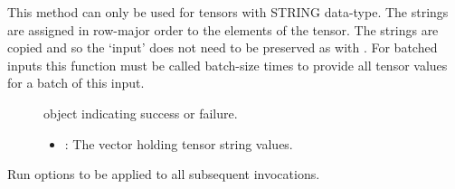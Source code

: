 \documentclass[letterpaper,10pt,english]{sphinxmanual}
\begin{document}
\begin{fulllineitems}
\begin{fulllineitems}
\begin{fulllineitems}
This method can only be used for tensors with STRING data-type. The strings are assigned in row-major order to the elements of the tensor. The strings are copied and so the ‘input’ does not need to be preserved as with {\hyperref[\detokenize{cpp_api/classnvidia_1_1inferenceserver_1_1client_1_1InferContext_1_1Input:classnvidia_1_1inferenceserver_1_1client_1_1InferContext_1_1Input_1a414fe9afbb60a48f162bac5439beee4d}]{}}. For batched inputs this function must be called batch-size times to provide all tensor values for a batch of this input. \begin{description}
\item[{}] \leavevmode
{\hyperref[\detokenize{cpp_api/classnvidia_1_1inferenceserver_1_1client_1_1Error:classnvidia_1_1inferenceserver_1_1client_1_1Error}]{}} object indicating success or failure. 

\item[{}] \leavevmode\begin{itemize}
\item {} 
: The vector holding tensor string values. 

\end{itemize}

\end{description}


\end{fulllineitems}


\end{fulllineitems}


\begin{fulllineitems}
\label{\detokenize{cpp_api/classnvidia_1_1inferenceserver_1_1client_1_1InferContext:_CPPv4N6nvidia15inferenceserver6client12InferContext7OptionsE}}%
\pysigstartmultiline
{}\label{\detokenize{cpp_api/classnvidia_1_1inferenceserver_1_1client_1_1InferContext:classnvidia_1_1inferenceserver_1_1client_1_1InferContext_1_1Options}}%
\pysigstopmultiline
Run options to be applied to all subsequent {\hyperref[\detokenize{cpp_api/classnvidia_1_1inferenceserver_1_1client_1_1InferContext:classnvidia_1_1inferenceserver_1_1client_1_1InferContext_1a4cac8002817c9259851305b14c258f36}]{}} invocations. 

\end{fulllineitems}
\end{fulllineitems}
\end{document}
